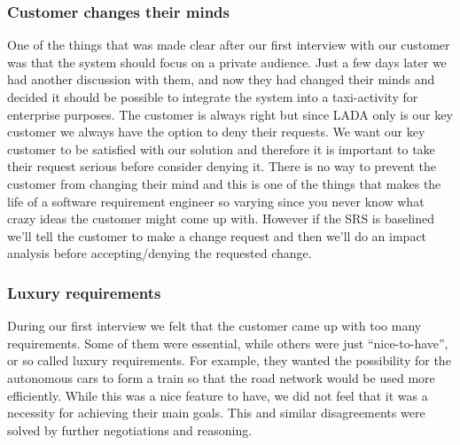 \documentclass[10pt]{article}
\begin{document}
\subsubsection{Customer changes their minds}
One of the things that was made clear after our first interview with our customer was that the system should focus on a private audience. Just a few days later we had another discussion with them, and now they had changed their minds and decided it should be possible to integrate the system into a taxi-activity for enterprise purposes. The customer is always right but since LADA only is our key customer we always have the option to deny their requests. We want our key customer to be satisfied with our solution and therefore it is important to take their request serious before consider denying it. There is no way to prevent the customer from changing their mind and this is one of the things that makes the life of a software requirement engineer so varying since you never know what crazy ideas the customer might come up with. However if the SRS is baselined we'll tell the customer to make a change request and then we'll do an impact analysis before accepting/denying the requested change.

\subsubsection{Luxury requirements}
During our first interview we felt that the customer came up with too many requirements. Some of them were essential, while others were just “nice-to-have”, or so called luxury requirements. For example, they wanted the possibility for the autonomous cars to form a train so that the road network would be used more efficiently. While this was a nice feature to have, we did not feel that it was a necessity for achieving their main goals. This and similar disagreements were solved by further negotiations and reasoning. 
\end{document}
